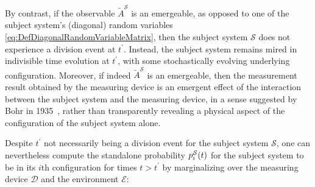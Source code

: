 \documentclass[12pt,english,prl,superscriptaddress,nobibnotes,nofootinbib]{revtex4-2}
\let\originalleft\left
\let\originalright\right
\renewcommand{\left}{\mathopen{}\mathclose\bgroup\originalleft}
\renewcommand{\right}{\aftergroup\egroup\originalright}
\begin{document}
By contrast, if the observable $\tilde{A}^{\mathcal{S}}$ is an emergeable,
as opposed to one of the subject system's (diagonal) random variables
\eqref{eq:DefDiagonalRandomVariableMatrix}, then the subject system
$\mathcal{S}$ does not experience a division event at $t^{\prime}$.
Instead, the subject system remains mired in indivisible time evolution
at $t^{\prime}$, with some stochastically evolving underlying configuration.
Moreover, if indeed $\tilde{A}^{\mathcal{S}}$ is an emergeable, then
the measurement result obtained by the measuring device is an emergent
effect of the interaction between the subject system and the measuring
device, in a sense suggested by Bohr in 1935~\citep{Bohr:1935cqmdoprbcc,Bell:1971itthvq},
rather than transparently revealing a physical aspect of the configuration
of the subject system alone. 

Despite $t^{\prime}$ not necessarily being a division event for the
subject system $\mathcal{S}$, one can nevertheless compute the standalone
probability $p_{i}^{\mathcal{S}}\left(t\right)$ for the subject system
to be in its $i$th configuration for times $t>t^{\prime}$ by marginalizing
over the measuring device $\mathcal{D}$ and the environment $\mathcal{E}$: 
\end{document}
